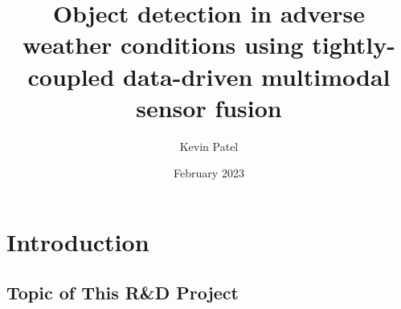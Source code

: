 \documentclass[rnd]{mas_proposal}
\title{Object detection in adverse weather conditions using tightly-coupled data-driven multimodal sensor fusion}
\author{Kevin Patel}
\date{February 2023}
\begin{document}
\maketitle

\pagestyle{plain}

\section{Introduction}

\subsection{Topic of This R\&D Project}
\begin{itemize}






\end{itemize}
\end{document}
